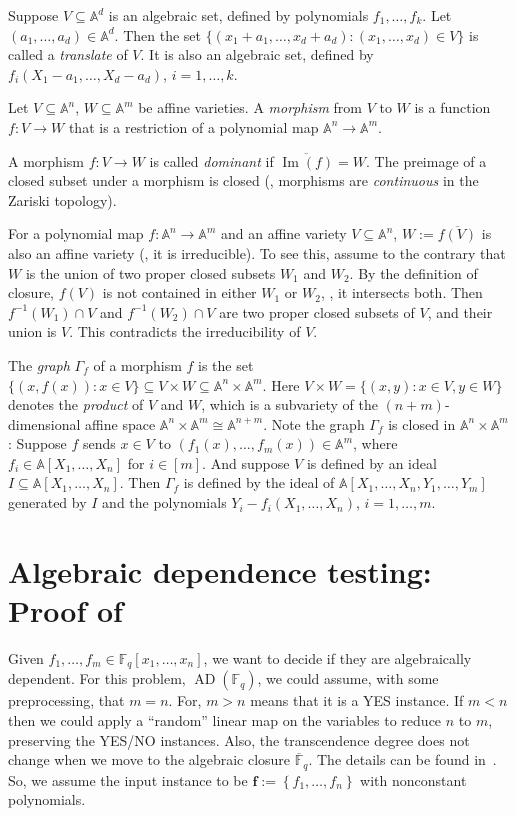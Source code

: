 \documentclass{toc}
\newcommand{\F}{\mathbb{F}}
\newcommand{\aff}{\mathbb{A}}
\DeclareMathOperator{\im}{\mathrm{Im}}
\newcommand{\ol}[1]{\overline{#1}}
\newcommand{\inbrace }[1]{\left\{#1\right\}}
\DeclareMathOperator{\AD}{\mathrm{AD}\xspace} %
\begin{document}
%
Suppose $V\subseteq\aff^d$ is an algebraic set, defined by polynomials $f_1,\dots,f_k$. Let $(a_1,\dots,a_d)\in\aff^d$. Then the set $\{(x_1+a_1,\dots,x_d+a_d): (x_1,\dots,x_d)\in V\}$ is called a \emph{translate} of $V$. It is also an algebraic set, defined by $f_i(X_1-a_1,\dots,X_d-a_d)$, $i=1,\dots,k$.

%
\begin{definition}[Morphism] %
Let $V\subseteq \aff^n$, $W\subseteq\aff^m$ be affine varieties. A \emph{morphism} from $V$ to $W$ is a function $f:V\to W$ that is a restriction of a polynomial map $\aff^n\to\aff^m$.
\end{definition}

A morphism $f: V\to W$ is called \emph{dominant} if $\overline{\im(f)}=W$.
The preimage of a closed subset under a morphism is closed (\ie, morphisms are \emph{continuous} in the Zariski topology).

For a polynomial map $f:\aff^n\to\aff^m$ and an affine variety $V\subseteq \aff^n$, $W:=\overline{f(V)}$ is also an affine variety (\ie, it is irreducible). To see this, assume to the contrary that $W$ is the union of two proper closed subsets $W_1$ and $W_2$. By the definition of closure, $f(V)$ is not contained in either $W_1$ or $W_2$, \ie, it intersects both. Then $f^{-1}(W_1)\cap V$ and $f^{-1}(W_2)\cap V$ are two proper closed subsets of $V$, and their union is $V$. This contradicts the irreducibility of $V$.

%
The \emph{graph} $\Gamma_f$ of a morphism $f$ is the set $\{(x,f(x)): x\in V\}\subseteq V\times W\subseteq \aff^n\times \aff^m$.
Here $V\times W=\{(x,y): x\in V,y\in W\}$ denotes the \emph{product} of $V$ and $W$, which is a subvariety of the $(n+m)$-dimensional affine space $\aff^n\times \aff^m\cong \aff^{n+m}$.
Note the graph $\Gamma_f$ is closed in $\aff^n\times \aff^m$: 
Suppose $f$ sends $x\in V$ to $(f_1(x),\dots,f_m(x))\in\aff^m$, where $f_i\in\aff[X_1,\dots,X_n]$ for $i\in [m]$.
And suppose $V$ is defined by an ideal $I\subseteq \aff[X_1,\dots,X_n]$. Then $\Gamma_f$ is defined by the ideal of $\aff[X_1,\dots,X_n,Y_1,\dots,Y_m]$ generated by $I$ and the polynomials $Y_i-f_i(X_1,\dots,X_n)$, $i=1,\dots,m$. 

%
\section{Algebraic dependence testing: Proof of  }\label{sec-dep}
%

Given $f_1,\dots,f_m\in \F_q[x_1,\dots,x_n]$, we want to decide if they are algebraically dependent. For this
%
problem, $\AD(\F_q)$,    %
we could assume, with some preprocessing, that $m=n$. For, $m>n$ means that
%
it is  %
a YES instance. If $m < n$ then we could apply a ``random'' linear map on the variables to reduce 
%
$n$ %
to $m$, preserving the YES/NO instances. Also, the transcendence degree does not change when we move to the algebraic closure $\ol{\F}_q$. The details can be found in~\cite[Lemmas~2.7--2.9]{pandey2016algebraic}. So, we assume the input instance to be $\mathbf f := \inbrace{f_1,\dots,f_n}$ with nonconstant polynomials.
 
\end{document}
